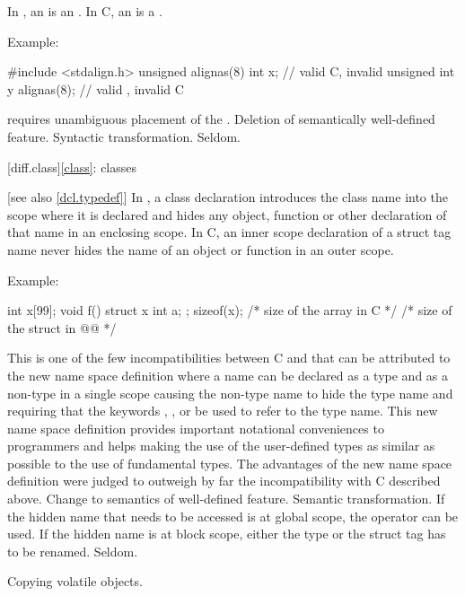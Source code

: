 \change
In \Cpp{},
an  is an .
In C, an  is a .

Example:
\begin{codeblock}
#include <stdalign.h>
unsigned alignas(8) int x;      // valid C, invalid \Cpp{}
unsigned int y alignas(8);      // valid \Cpp{}, invalid C
\end{codeblock}
\rationale
\Cpp{} requires unambiguous placement of the .
\effect
Deletion of semantically well-defined feature.
\difficulty
Syntactic transformation.
\howwide
Seldom.

[diff.class]{\ref{class}: classes}

 [see also \ref{dcl.typedef}]
\change
In \Cpp{}, a class declaration introduces the class name into the scope where it is
declared and hides any object, function or other declaration of that name in an enclosing
scope. In C, an inner scope declaration of a struct tag name never hides the name of an
object or function in an outer scope.

Example:
\begin{codeblock}
int x[99];
void f() {
  struct x { int a; };
  sizeof(x);  /* size of the array in C */
  /* size of the struct in @\textit{\textrm{\Cpp{}}}@ */
}
\end{codeblock}
\rationale
This is one of the few incompatibilities between C and \Cpp{} that
can be attributed to the new \Cpp{} name space definition where a
name can be declared as a type and as a non-type in a single scope
causing the non-type name to hide the type name and requiring that
the keywords , ,  or  be used to refer to the type name.
This new name space definition provides important notational
conveniences to \Cpp{} programmers and helps making the use of the
user-defined types as similar as possible to the use of fundamental
types.
The advantages of the new name space definition were judged to
outweigh by far the incompatibility with C described above.
\effect
Change to semantics of well-defined feature.
\difficulty
Semantic transformation.
If the hidden name that needs to be accessed is at global scope,
the \tcode{::} \Cpp{} operator can be used.
If the hidden name is at block scope, either the type or the struct
tag has to be renamed.
\howwide
Seldom.

\change
Copying volatile objects.

